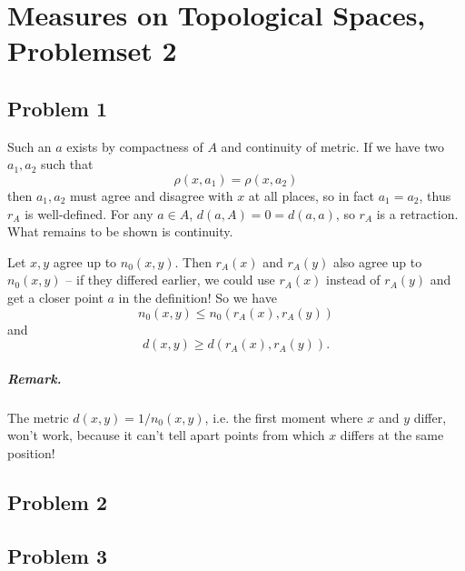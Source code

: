 \chapter{Measures on Topological Spaces, Problemset 2}

\section*{Problem 1}

Such an \( a \) exists by compactness of \( A \) and continuity of metric. If we have two \( a_1, a_2 \) such that 
\[ 
    \rho(x, a_1) = \rho(x, a_2) 
\]
then \( a_1, a_2 \) must agree and disagree with \( x \) at all places, so in fact \( a_1 = a_2 \), thus \( r_A \) is well-defined. For any \( a \in A \), \( d(a,A) = 0 = d(a,a) \), so \( r_A \) is a retraction. What remains to be shown is continuity.

Let \( x, y \) agree up to \( n_0(x,y) \). Then \( r_A(x) \) and \( r_A(y) \) also agree up to \( n_0(x,y) \) -- if they differed earlier, we could use \( r_A(x) \) instead of \( r_A(y) \) and get a closer point \( a \) in the definition! So we have
\[ 
    n_0(x, y) \leqslant n_0 \left( r_A(x), r_A(y) \right) 
\]
and
\[ 
    d(x,y) \geqslant d \left(  r_A(x), r_A(y) \right).
\]

\paragraph{Remark.} The metric \( d(x,y) = 1/n_0(x,y) \), i.e. the first moment where \( x \) and \( y \) differ, won't work, because it can't tell apart points from which \( x \) differs at the same position!

\section*{Problem 2}



\section*{Problem 3}

